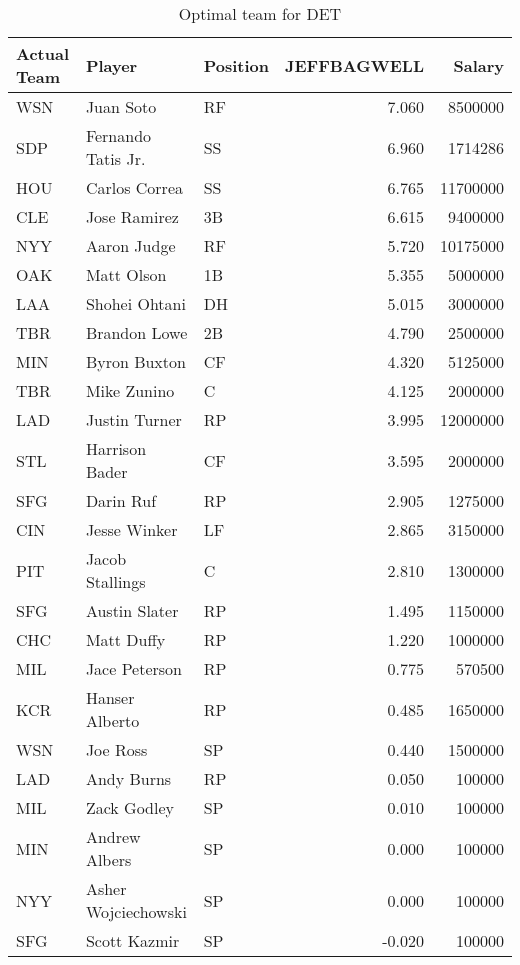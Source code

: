 \begin{table}

\caption{Optimal team for DET}
\centering
\begin{tabular}[t]{l|l|l|r|r}
\hline
Actual Team & Player & Position & JEFFBAGWELL & Salary\\
\hline
WSN & Juan Soto & RF & 7.060 & 8500000\\
\hline
SDP & Fernando Tatis Jr. & SS & 6.960 & 1714286\\
\hline
HOU & Carlos Correa & SS & 6.765 & 11700000\\
\hline
CLE & Jose Ramirez & 3B & 6.615 & 9400000\\
\hline
NYY & Aaron Judge & RF & 5.720 & 10175000\\
\hline
OAK & Matt Olson & 1B & 5.355 & 5000000\\
\hline
LAA & Shohei Ohtani & DH & 5.015 & 3000000\\
\hline
TBR & Brandon Lowe & 2B & 4.790 & 2500000\\
\hline
MIN & Byron Buxton & CF & 4.320 & 5125000\\
\hline
TBR & Mike Zunino & C & 4.125 & 2000000\\
\hline
LAD & Justin Turner & RP & 3.995 & 12000000\\
\hline
STL & Harrison Bader & CF & 3.595 & 2000000\\
\hline
SFG & Darin Ruf & RP & 2.905 & 1275000\\
\hline
CIN & Jesse Winker & LF & 2.865 & 3150000\\
\hline
PIT & Jacob Stallings & C & 2.810 & 1300000\\
\hline
SFG & Austin Slater & RP & 1.495 & 1150000\\
\hline
CHC & Matt Duffy & RP & 1.220 & 1000000\\
\hline
MIL & Jace Peterson & RP & 0.775 & 570500\\
\hline
KCR & Hanser Alberto & RP & 0.485 & 1650000\\
\hline
WSN & Joe Ross & SP & 0.440 & 1500000\\
\hline
LAD & Andy Burns & RP & 0.050 & 100000\\
\hline
MIL & Zack Godley & SP & 0.010 & 100000\\
\hline
MIN & Andrew Albers & SP & 0.000 & 100000\\
\hline
NYY & Asher Wojciechowski & SP & 0.000 & 100000\\
\hline
SFG & Scott Kazmir & SP & -0.020 & 100000\\
\hline
\end{tabular}
\end{table}
